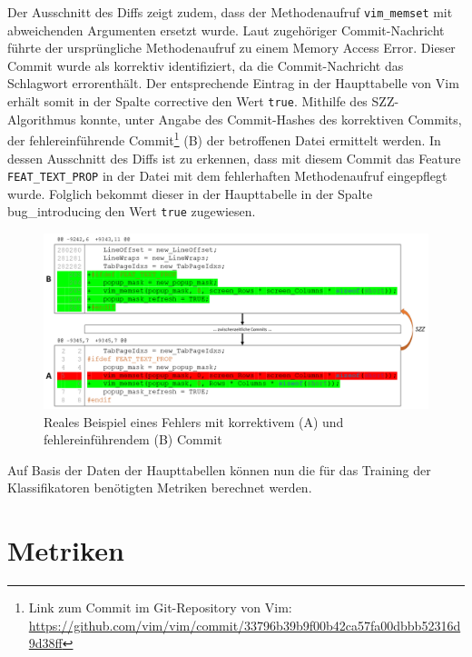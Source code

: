 Der Ausschnitt des Diffs zeigt zudem, dass der Methodenaufruf \texttt{vim\_memset} mit abweichenden Argumenten ersetzt wurde. Laut zugehöriger Commit-Nachricht führte der ursprüngliche Methodenaufruf zu einem \glqq Memory Access Error\grqq. Dieser Commit wurde als korrektiv identifiziert, da die Commit-Nachricht das Schlagwort \glqq error\grqq enthält. Der entsprechende Eintrag in der Haupttabelle von Vim erhält somit in der Spalte \glqq corrective\grqq{} den Wert \texttt{true}. Mithilfe des SZZ-Algorithmus konnte, unter Angabe des Commit-Hashes des korrektiven Commits, der fehlereinführende Commit\footnote{Link zum Commit im Git-Repository von Vim: \url{https://github.com/vim/vim/commit/33796b39b9f00b42ca57fa00dbbb52316d9d38ff}} (B) der betroffenen Datei ermittelt werden. In dessen Ausschnitt des Diffs ist zu erkennen, dass mit diesem Commit das Feature \texttt{FEAT\_TEXT\_PROP} in der Datei mit dem fehlerhaften Methodenaufruf eingepflegt wurde. Folglich bekommt dieser in der Haupttabelle in der Spalte \glqq bug\_introducing\grqq{} den Wert \texttt{true} zugewiesen.

\begin{figure}[H]
    \centering
    \includegraphics[width=\textwidth]{images/Bug_example_real}
    \caption{Reales Beispiel eines Fehlers mit korrektivem (A) und fehlereinführendem (B) Commit\label{fig:bug-example}}
\end{figure}

Auf Basis der Daten der Haupttabellen können nun die für das Training der Klassifikatoren benötigten Metriken berechnet werden.

\section{Metriken}

